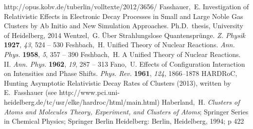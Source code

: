 \documentclass[journal=jpccck,manuscript=article]{achemso}
\begin{document}
\begin{mcitethebibliography}{73}
  http://opus.kobv.de/tuberlin/volltexte/2012/3656/\relax
\mciteBstWouldAddEndPuncttrue
\mciteSetBstMidEndSepPunct{\mcitedefaultmidpunct}
{\mcitedefaultendpunct}{\mcitedefaultseppunct}\relax
\EndOfBibitem
{}
Fasshauer,~E. Investigation of Relativistic Effects in Electronic Decay
  Processes in Small and Large Noble Gas Clusters by Ab Initio and New
  Simulation Approaches. Ph.D.\ thesis, University of Heidelberg, 2014\relax
\mciteBstWouldAddEndPuncttrue
\mciteSetBstMidEndSepPunct{\mcitedefaultmidpunct}
{\mcitedefaultendpunct}{\mcitedefaultseppunct}\relax
\EndOfBibitem
{}
Wentzel,~G. {\"U}ber Strahlungslose Quantenspr{\"u}nge. \emph{Z. Physik}
  \textbf{1927}, \emph{43}, 524 -- 530\relax
\mciteBstWouldAddEndPuncttrue
\mciteSetBstMidEndSepPunct{\mcitedefaultmidpunct}
{\mcitedefaultendpunct}{\mcitedefaultseppunct}\relax
\EndOfBibitem
{}
Feshbach,~H. Unified Theory of Nuclear Reactions. \emph{Ann. Phys.}
  \textbf{1958}, \emph{5}, 357 -- 390\relax
\mciteBstWouldAddEndPuncttrue
\mciteSetBstMidEndSepPunct{\mcitedefaultmidpunct}
{\mcitedefaultendpunct}{\mcitedefaultseppunct}\relax
\EndOfBibitem
{}
Feshbach,~H. A Unified Theory of Nuclear Reactions. II. \emph{Ann. Phys.}
  \textbf{1962}, \emph{19}, 287 -- 313\relax
\mciteBstWouldAddEndPuncttrue
\mciteSetBstMidEndSepPunct{\mcitedefaultmidpunct}
{\mcitedefaultendpunct}{\mcitedefaultseppunct}\relax
\EndOfBibitem
{}
Fano,~U. Effects of Configuration Interaction on Intensities and Phase Shifts.
  \emph{Phys. Rev.} \textbf{1961}, \emph{124}, 1866--1878\relax
\mciteBstWouldAddEndPuncttrue
\mciteSetBstMidEndSepPunct{\mcitedefaultmidpunct}
{\mcitedefaultendpunct}{\mcitedefaultseppunct}\relax
\EndOfBibitem
{}
{HARDRoC}, Hunting Asymptotic Relativistic Decay Rates of Clusters (2013),
  written by E.~Fasshauer (see
  http://www.pci.uni-heidelberg.de/tc/usr/elke/hardroc/html/main.html)\relax
\mciteBstWouldAddEndPuncttrue
\mciteSetBstMidEndSepPunct{\mcitedefaultmidpunct}
{\mcitedefaultendpunct}{\mcitedefaultseppunct}\relax
\EndOfBibitem
{}
Haberland,~H. \emph{Clusters of Atoms and Molecules Theory, Experiment, and
  Clusters of Atoms}; Springer Series in Chemical Physics; Springer Berlin
  Heidelberg: Berlin, Heidelberg, 1994; p 422\relax
\mciteBstWouldAddEndPuncttrue
\mciteSetBstMidEndSepPunct{\mcitedefaultmidpunct}
{\mcitedefaultendpunct}{\mcitedefaultseppunct}\relax
\EndOfBibitem
{}

\end{mcitethebibliography}
\end{document}
